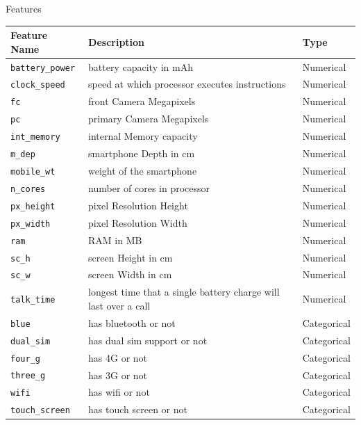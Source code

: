 \documentclass[14pt, aspectratio=169]{beamer}
\begin{document}
\begin{frame}{Features}
  \vspace{-0.25em}
  \scriptsize
  \begin{table}[H]
    \begin{tabular}{lll}
      \toprule
      \textbf{Feature Name}   & \textbf{Description}  & \textbf{Type}  \\
      \toprule
      \texttt{battery\_power} & battery capacity in mAh   & Numerical  \\
      \texttt{clock\_speed}   & speed at which processor executes instructions & Numerical \\
      \texttt{fc}             & front Camera Megapixels & Numerical \\
      \texttt{pc}             & primary Camera Megapixels & Numerical \\
      \texttt{int\_memory}    & internal Memory capacity & Numerical \\
      \texttt{m\_dep}         & smartphone Depth in cm & Numerical \\
      \texttt{mobile\_wt}     & weight of the smartphone & Numerical \\
      \texttt{n\_cores}       & number of cores in processor & Numerical \\
      \texttt{px\_height}     & pixel Resolution Height & Numerical \\
      \texttt{px\_width}      & pixel Resolution Width & Numerical \\
      \texttt{ram}            & RAM in MB & Numerical \\
      \texttt{sc\_h}          & screen Height in cm & Numerical \\
      \texttt{sc\_w}          & screen Width in cm & Numerical \\
      \texttt{talk\_time}     & longest time that a single battery charge will last over a call & Numerical \\
      \texttt{blue}           & has bluetooth or not  & Categorical   \\
      \texttt{dual\_sim}      & has dual sim support or not & Categorical \\
      \texttt{four\_g}        & has 4G or not & Categorical \\
      \texttt{three\_g}       & has 3G or not & Categorical \\
      \texttt{wifi}           & has wifi or not & Categorical \\
      \texttt{touch\_screen}  & has touch screen or not & Categorical \\
      \bottomrule
    \end{tabular}
  \end{table}
\end{frame}
\end{document}
